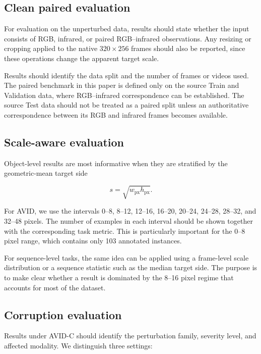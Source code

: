 \documentclass[10pt]{article}
\newcommand{\dataset}{\textsc{AVID}}
\newcommand{\corrupt}{\textsc{AVID-C}}
\begin{document}
\subsection{Clean paired evaluation}

For evaluation on the unperturbed data, results should state whether the input consists of RGB, infrared, or paired RGB--infrared observations. Any resizing or cropping applied to the native $320\times256$ frames should also be reported, since these operations change the apparent target scale.

Results should identify the data split and the number of frames or videos used. The paired benchmark in this paper is defined only on the source Train and Validation data, where RGB--infrared correspondence can be established. The source Test data should not be treated as a paired split unless an authoritative correspondence between its RGB and infrared frames becomes available.

\subsection{Scale-aware evaluation}

Object-level results are most informative when they are stratified by the geometric-mean target side

\begin{equation}
s=\sqrt{w_{\mathrm{px}}h_{\mathrm{px}}}.
\end{equation}

For \dataset{}, we use the intervals 0--8, 8--12, 12--16, 16--20, 20--24, 24--28, 28--32, and 32--48 pixels. The number of examples in each interval should be shown together with the corresponding task metric. This is particularly important for the 0--8 pixel range, which contains only 103 annotated instances.

For sequence-level tasks, the same idea can be applied using a frame-level scale distribution or a sequence statistic such as the median target side. The purpose is to make clear whether a result is dominated by the 8--16 pixel regime that accounts for most of the dataset.

\subsection{Corruption evaluation}

Results under \corrupt{} should identify the perturbation family, severity level, and affected modality. We distinguish three settings:
\end{document}
